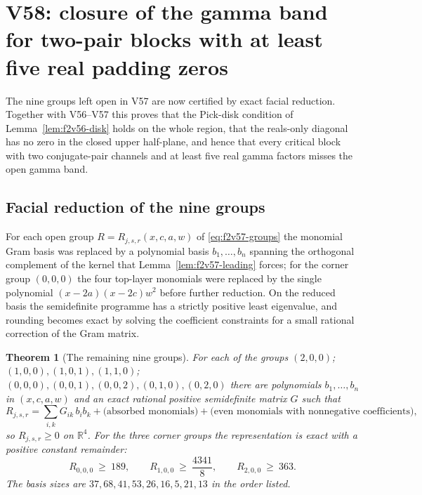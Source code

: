 \documentclass[11pt]{article}
\newtheorem{theorem}{Theorem}[section]
\theoremstyle{definition}
\theoremstyle{remark}
\begin{document}
\clearpage
\section{V58: closure of the gamma band for two-pair blocks with at least five real padding zeros}
\label{sec:f2v58-two-pair-band}
\begingroup
\setcounter{equation}{0}
\renewcommand{\theequation}{N58.\arabic{equation}}
\renewcommand{\theHequation}{f2v58.\arabic{equation}}

The nine groups left open in V57 are now certified by exact facial
reduction.  Together with V56--V57 this proves that the Pick-disk
condition of Lemma~\ref{lem:f2v56-disk} holds on the whole region, that
the reals-only diagonal has no zero in the closed upper half-plane, and
hence that every critical block with two conjugate-pair channels and at
least five real gamma factors misses the open gamma band.

\subsection{Facial reduction of the nine groups}

For each open group \(R=R_{j,s,r}(x,c,a,w)\) of
\eqref{eq:f2v57-groups} the monomial Gram basis was replaced by a
polynomial basis \(b_1,\ldots,b_n\) spanning the orthogonal complement
of the kernel that Lemma~\ref{lem:f2v57-leading} forces; for the corner
group \((0,0,0)\) the four top-layer monomials were replaced by the
single polynomial \((x-2a)(x-2c)w^2\) before further reduction.  On the
reduced basis the semidefinite programme has a strictly positive least
eigenvalue, and rounding becomes exact by solving the coefficient
constraints for a small rational correction of the Gram matrix.

\begin{theorem}[The remaining nine groups]
\label{thm:f2v58-groups}
For each of the groups \((2,0,0)\); \((1,0,0),(1,0,1),(1,1,0)\);
\((0,0,0),(0,0,1),(0,0,2),(0,1,0),(0,2,0)\) there are polynomials
\(b_1,\ldots,b_n\) in \((x,c,a,w)\) and an exact rational positive
semidefinite matrix \(G\) such that
\begin{equation}
 R_{j,s,r}=\sum_{i,k}G_{ik}\,b_ib_k+\text{(absorbed monomials)}
 +\text{(even monomials with nonnegative coefficients)},
 \label{eq:f2v58-cert}
\end{equation}
so \(R_{j,s,r}\ge0\) on \(\mathbb R^4\).  For the three corner groups the
representation is exact with a positive constant remainder:
\begin{equation}
 R_{0,0,0}\ \ge\ 189,\qquad R_{1,0,0}\ \ge\ \frac{4341}{8},\qquad
 R_{2,0,0}\ \ge\ 363 .
 \label{eq:f2v58-corners}
\end{equation}
The basis sizes are \(37,68,41,53,26,16,5,21,13\) in the order listed.
\end{theorem}
\end{document}
